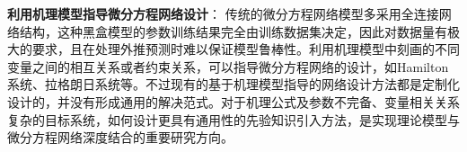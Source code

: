 \textbf{利用机理模型指导微分方程网络设计}：
传统的微分方程网络模型多采用全连接网络结构，这种黑盒模型的参数训练结果完全由训练数据集决定，因此对数据量有极大的要求，且在处理外推预测时难以保证模型鲁棒性。利用机理模型中刻画的不同变量之间的相互关系或者约束关系，可以指导微分方程网络的设计，如Hamilton系统、拉格朗日系统等。不过现有的基于机理模型指导的网络设计方法都是定制化设计的，并没有形成通用的解决范式。对于机理公式及参数不完备、变量相关关系复杂的目标系统，如何设计更具有通用性的先验知识引入方法，是实现理论模型与微分方程网络深度结合的重要研究方向。

